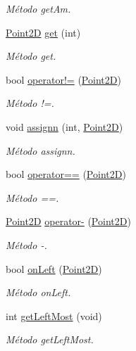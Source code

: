 \begin{DoxyCompactItemize}
\begin{DoxyCompactList}\small\item\em Método get\-Am. \end{DoxyCompactList}\item 
\hyperlink{class_point2_d}{Point2\-D} \hyperlink{class_point2_d_a59c6ec04c22e19fe1edc9f62665343d4}{get} (int)
\begin{DoxyCompactList}\small\item\em Método get. \end{DoxyCompactList}\item 
bool \hyperlink{class_point2_d_a7298e6af31fcc1d34c6ce2d58cd67fec}{operator!=} (\hyperlink{class_point2_d}{Point2\-D})
\begin{DoxyCompactList}\small\item\em Método !=. \end{DoxyCompactList}\item 
void \hyperlink{class_point2_d_ae18c4797b3cd5ffceee102b4ff0b7e73}{assignn} (int, \hyperlink{class_point2_d}{Point2\-D})
\begin{DoxyCompactList}\small\item\em Método assignn. \end{DoxyCompactList}\item 
bool \hyperlink{class_point2_d_a24fd3ed564dbec04a4ea1346d27352c3}{operator==} (\hyperlink{class_point2_d}{Point2\-D})
\begin{DoxyCompactList}\small\item\em Método ==. \end{DoxyCompactList}\item 
\hyperlink{class_point2_d}{Point2\-D} \hyperlink{class_point2_d_a236083ccbbd0fc13e36f352ee998c2c5}{operator-\/} (\hyperlink{class_point2_d}{Point2\-D})
\begin{DoxyCompactList}\small\item\em Método -\/. \end{DoxyCompactList}\item 
bool \hyperlink{class_point2_d_a57271ac24549f078e8766290c22274c9}{on\-Left} (\hyperlink{class_point2_d}{Point2\-D})
\begin{DoxyCompactList}\small\item\em Método on\-Left. \end{DoxyCompactList}\item 
int \hyperlink{class_point2_d_aa59df8b613913c720f865d4fd82e2452}{get\-Left\-Most} (void)
\begin{DoxyCompactList}\small\item\em Método get\-Left\-Most. \end{DoxyCompactList}\end{DoxyCompactItemize}


